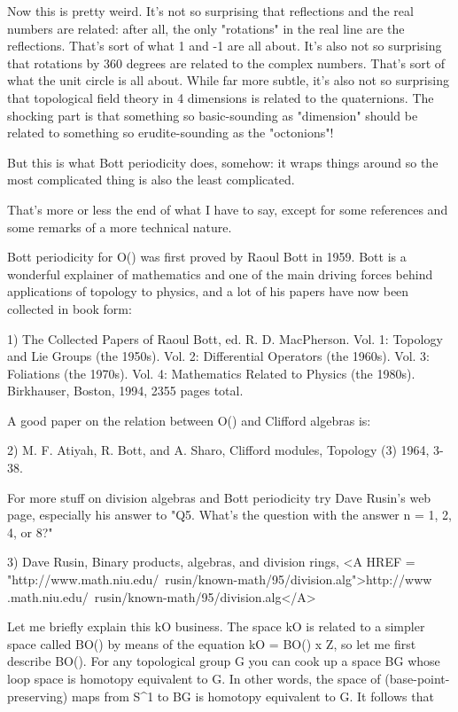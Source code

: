 Now this is pretty weird.  It's not so surprising that reflections and the
real numbers are related: after all, the only "rotations" in the real
line are the reflections.  That's sort of what 1 and -1 are all about.
It's also not so surprising that rotations by 360 degrees are related to
the complex numbers.  That's sort of what the unit circle is all
about.  While far more subtle, it's also not so surprising that
topological field theory in 4 dimensions is related to the quaternions.  
The shocking part is that something so basic-sounding as "dimension"
should be related to something so erudite-sounding as the "octonions"!

But this is what Bott periodicity does, somehow: it wraps things around
so the most complicated thing is also the least complicated.

That's more or less the end of what I have to say, except for some
references and some remarks of a more technical nature.

Bott periodicity for O(\infty ) was first proved by Raoul Bott in
1959.  Bott is a wonderful explainer of mathematics and one of the
main driving forces behind applications of topology to physics, and
a lot of his papers have now been collected in book form:

1) The Collected Papers of Raoul Bott, ed. R. D. MacPherson.  Vol. 1:
Topology and Lie Groups (the 1950s).  Vol. 2: Differential Operators
(the 1960s).  Vol. 3: Foliations (the 1970s).  Vol. 4: Mathematics
Related to Physics (the 1980s).  Birkhauser, Boston, 1994, 2355 pages
total.  

A good paper on the relation between O(\infty ) and Clifford algebras
is:

2) M. F. Atiyah, R. Bott, and A. Sha\pi ro, Clifford modules, Topology 
(3) 1964, 3-38.  

For more stuff on division algebras and Bott periodicity try Dave Rusin's
web page, especially his answer to "Q5.  What's the question with the
answer n = 1, 2, 4, or 8?"

3) Dave Rusin, Binary products, algebras, and division rings,
<A HREF = "http://www.math.niu.edu/~rusin/known-math/95/division.alg">http://www
.math.niu.edu/~rusin/known-math/95/division.alg</A>

Let me briefly explain this kO business.  The space kO is 
related to a simpler space called BO(\infty ) by means of the
equation
kO = BO(\infty ) x Z,
so let me first describe BO(\infty ).  For any
topological group G you can cook up a space BG whose loop space is
homotopy equivalent to G.  In other words, the space of (base-point-preserving)
maps from S^{1} to BG is homotopy equivalent to G.  It follows that

